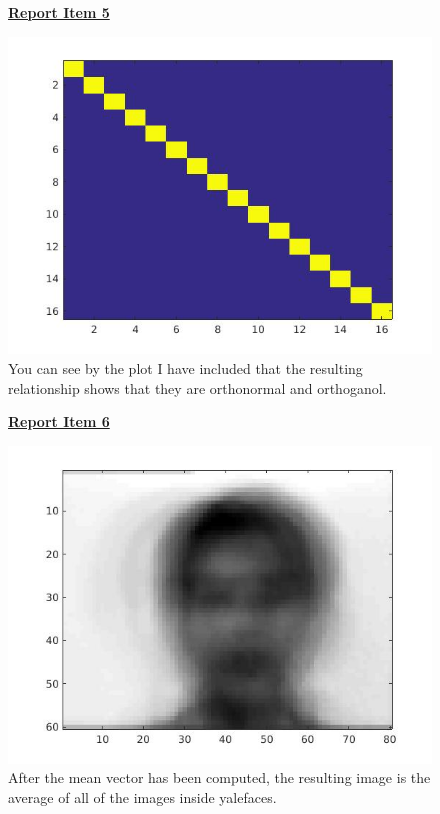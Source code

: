 \documentclass{article}
\begin{document}
\begin{figure}[H]
\color{red}
\underline{\textbf{Report Item 5}}
\color{black}

\includegraphics[scale =.5]{report5_1}
\\You can see by the plot I have included that the resulting relationship shows that they are orthonormal and orthoganol.
\end{figure}


\begin{figure}[H]
  \color{red}
  \underline{\textbf{Report Item 6}}
  \color{black}


\includegraphics[scale =.5]{report6_1}
\\After the mean vector has been computed, the resulting image is the average of all of the images inside yalefaces.
\end{figure}
\end{document}
